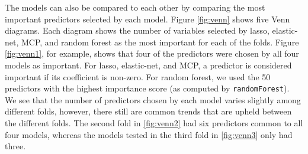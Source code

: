 \documentclass{article}
\begin{document}
The models can also be compared to each other by comparing the most important predictors selected by each model. Figure \ref{fig:venn} shows five Venn diagrams. Each diagram shows the number of variables selected by lasso, elastic-net, MCP, and random forest as the most important for each of the folds. Figure \ref{fig:venn1}, for example, shows that four of the predictors were chosen by all four models as important. For lasso, elastic-net, and MCP, a predictor is considered important if its coefficient is non-zero. For random forest, we used the 50 predictors with the highest importance score (as computed by \lstinline!randomForest!). We see that the number of predictors chosen by each model varies slightly among different folds, however, there still are common trends that are upheld between the different folds. The second fold in \ref{fig:venn2} had six predictors common to all four models, whereas the models tested in the third fold in \ref{fig:venn3} only had three.
\end{document}

